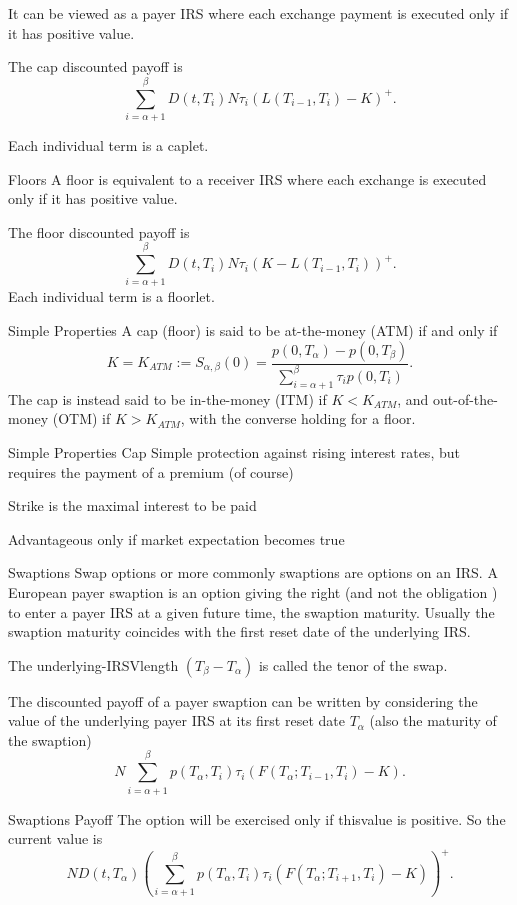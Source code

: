 	It can be viewed as a payer IRS where
	each exchange payment is executed only if it has positive value.
	
	The cap discounted payoff is
		$$
		\sum_{i=\alpha+1}^{\beta}D(t,T_i)N\tau_i(L(T_{i-1},T_i)-K)^+.
		$$
	
	Each individual term is a caplet.


Floors
	A floor is equivalent to a receiver IRS where each exchange is executed only
	if it has positive value.

	The floor discounted payoff is
		$$
		\sum_{i=\alpha+1}^{\beta}D(t,T_i)N\tau_i(K-L(T_{i-1},T_i))^+.
		$$
	Each individual term is a floorlet.




Simple Properties
	A cap (floor) is said to be at-the-money (ATM) if and only if
		$$
		K=K_{ATM}:=S_{\alpha,\beta}(0)=\frac{p(0,T_{\alpha})-p(0,T_{\beta})}{\sum_{i=\alpha+1}^{\beta}\tau_ip(0,T_i)}.
		$$
	The cap is instead said to be in-the-money (ITM) if $K<K_{ATM}$,
	and out-of-the-money (OTM) if $K>K_{ATM}$, with the converse
	holding for a floor.
	

Simple Properties Cap
	Simple protection against rising interest rates, but requires the payment of a premium (of course)
	
	Strike is the maximal interest to be paid
	
	Advantageous only if market expectation becomes true


Swaptions
	Swap options or more commonly swaptions are options on an IRS. A
	European payer swaption is an option giving the right (and not the
	obligation ) to enter a payer IRS at a given future time, the
	swaption maturity. Usually the swaption maturity coincides with
	the first reset date of the underlying IRS.

	The underlying-IRSVlength $(T_{\beta}-T_{\alpha})$ is called the tenor of the swap.
	
	The discounted payoff of a payer swaption can be written by
	considering the value of the underlying payer IRS at its first
	reset date $T_{\alpha}$ (also the maturity of the swaption)
		$$
		N\sum_{i=\alpha+1}^{\beta} p(T_{\alpha},T_i)\tau_i(F(T_{\alpha};T_{i-1},T_i)-K).
		$$


Swaptions Payoff
	The option will be exercised only if thisvalue is positive. So the current value is
		$$
		ND(t,T_{\alpha})\left(\sum_{i=\alpha+1}^{\beta}p(T_{\alpha},T_i)\tau_i
		(F(T_{\alpha};T_{i+1},T_i)-K)\right)^+.
		$$


